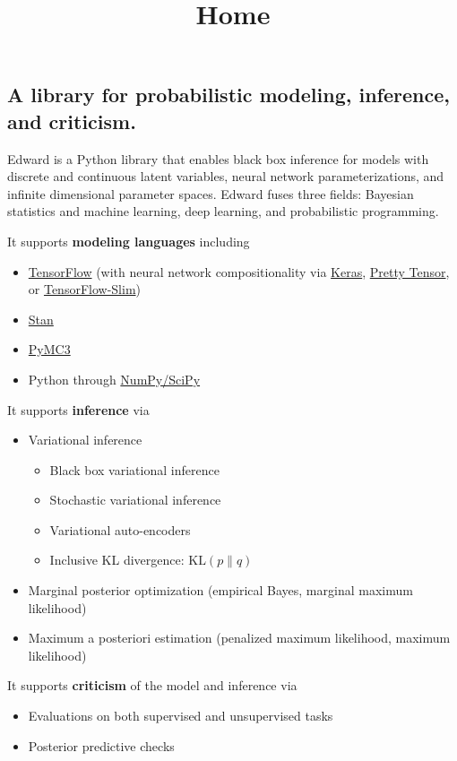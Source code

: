 \title{Home}

\subsection{A library for probabilistic modeling, inference, and criticism.}
Edward is a Python library that enables black box inference for models with
discrete and continuous latent variables, neural network parameterizations, and
infinite dimensional parameter spaces. Edward fuses three fields: Bayesian
statistics and machine learning, deep learning, and probabilistic programming.

It supports \textbf{modeling languages} including
\begin{itemize}
\item \href{https://www.tensorflow.org}{TensorFlow} (with neural network
  compositionality via \href{http://keras.io}{Keras},
  \href{https://github.com/google/prettytensor}{Pretty Tensor}, or
  \href{https://github.com/tensorflow/models/blob/master/inception/inception/slim/README.md}{TensorFlow-Slim})
\item \href{http://mc-stan.org}{Stan}
\item \href{http://pymc-devs.github.io/pymc3/}{PyMC3}
\item Python through \href{http://scipy.org/}{NumPy/SciPy}
\end{itemize}

It supports \textbf{inference} via
\begin{itemize}
\item Variational inference
\begin{itemize}
    \item Black box variational inference
    \item Stochastic variational inference
    \item Variational auto-encoders
    \item Inclusive KL divergence: $\text{KL}(p\|q)$
  \end{itemize}
\item Marginal posterior optimization (empirical Bayes, marginal maximum
likelihood)
\item Maximum a posteriori estimation (penalized maximum likelihood, maximum
  likelihood)
\end{itemize}

It supports \textbf{criticism} of the model and inference via
\begin{itemize}
\item Evaluations on both supervised and unsupervised tasks
\item Posterior predictive checks
\end{itemize}


